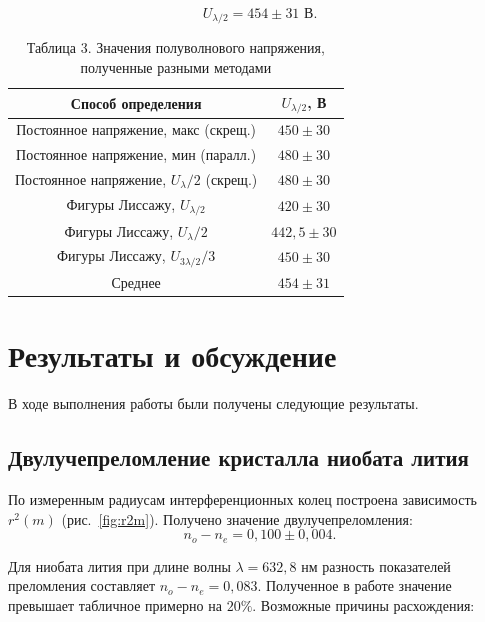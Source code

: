 \documentclass[a4paper]{article}
\begin{document}
\[
U_{\lambda/2} = 454 \pm 31 \text{ В}.
\]

\begin{table}[h!]
\centering
\begin{tabular}{|c|c|}
\hline
Способ определения & $U_{\lambda/2}$, В \\
\hline
Постоянное напряжение, макс (скрещ.) & $450 \pm 30$ \\
Постоянное напряжение, мин (паралл.) & $480 \pm 30$ \\
Постоянное напряжение, $U_\lambda/2$ (скрещ.) & $480 \pm 30$ \\
Фигуры Лиссажу, $U_{\lambda/2}$ & $420 \pm 30$ \\
Фигуры Лиссажу, $U_\lambda/2$ & $442{,}5 \pm 30$ \\
Фигуры Лиссажу, $U_{3\lambda/2}/3$ & $450 \pm 30$ \\
\hline
Среднее & $454 \pm 31$ \\
\hline
\end{tabular}
\caption{Таблица 3. Значения полуволнового напряжения, полученные разными методами}
\label{tab:U_half}
\end{table}

\section{Результаты и обсуждение}

В ходе выполнения работы были получены следующие результаты.

\subsection*{Двулучепреломление кристалла ниобата лития}

По измеренным радиусам интерференционных колец построена зависимость $r^2(m)$ (рис.~\ref{fig:r2m}). Получено значение двулучепреломления:
\[
n_o - n_e = 0,100 \pm 0,004.
\]

Для ниобата лития при длине волны $\lambda = 632,8$ нм разность показателей преломления составляет $n_o - n_e = 0,083$\footnotemark[4]. Полученное в работе значение превышает табличное примерно на $20\%$. Возможные причины расхождения:

\end{document}
